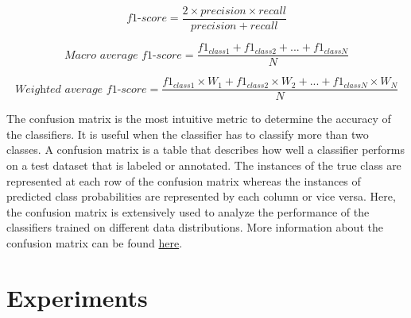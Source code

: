\begin{equation}\label{f1-score}
\textit{f1-score} = \frac{2 \times precision \times recall}{precision + recall}
\end{equation}


\begin{equation}\label{macrof1-score} 
\textit{Macro average f1-score} =  \frac{f1_{class1} + f1_{class2}+ ... + f1_{classN}}{N}
\end{equation}


\begin{equation}\label{Weightedf1-score} 
\textit{Weighted average f1-score} =  \frac{f1_{class1} \times W_1 + f1_{class2} \times W_2 + ... + f1_{classN} \times W_N}{N}
\end{equation}



The confusion matrix is the most intuitive metric to determine the accuracy of the classifiers. It is useful when the classifier has to classify more than two classes. A confusion matrix is a table that describes how well a classifier performs on a test dataset that is labeled or annotated. The instances of the true class are represented at each row of the confusion matrix whereas the instances of predicted class probabilities are represented by each column or vice versa. Here, the confusion matrix is extensively used to analyze the performance of the classifiers trained on different data distributions. More information about the confusion matrix can be found \href{https://en.wikipedia.org/wiki/Confusion_matrix}{here}\footnotemark.


\section{Experiments}\label{experiments}


